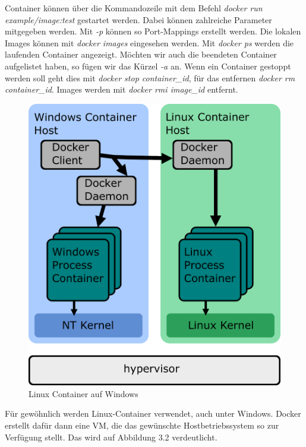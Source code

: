 \documentclass[12pt,a4paper]{scrartcl}
\begin{document}
Container können über die Kommandozeile mit dem Befehl  \emph{docker run example/image:test} gestartet werden. Dabei können zahlreiche Parameter mitgegeben werden. Mit \emph{-p} können so Port-Mappings erstellt werden. Die lokalen Images können mit \emph{docker images} eingesehen werden. Mit \emph{docker ps} werden die laufenden Container angezeigt. Möchten wir auch die beendeten Container aufgelistet haben, so fügen wir das Kürzel \emph{-a} an. Wenn ein Container gestoppt werden soll geht dies mit \emph{docker stop container\_id}, für das entfernen \emph{docker rm container\_id}. Images werden mit \emph{docker rmi image\_id} entfernt.  

\begin{figure}[h!]
	\centering
	\includegraphics[scale=2]{DockerWindows.png}
	\caption[https://docs.microsoft.com/de-de/virtualization/windowscontainers/deploy-containers/linux-containers]{Linux Container auf Windows}
\end{figure}

Für gewöhnlich werden Linux-Container verwendet, auch unter Windows. Docker erstellt dafür dann eine VM, die das gewünschte Hostbetriebssystem so zur Verfügung stellt. Das wird auf Abbildung 3.2 verdeutlicht. 
\end{document}
